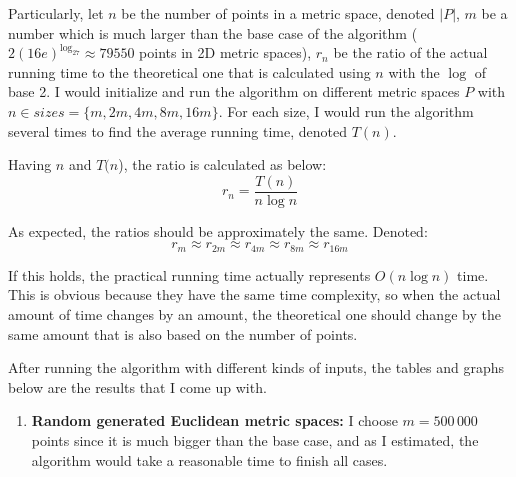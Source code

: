 \documentclass[12pt,english,]{article}
\providecommand{\tightlist}{%
  \setlength{\itemsep}{0pt}\setlength{\parskip}{0pt}}
\begin{document}
Particularly, let \(n\) be the number of points in a metric space,
denoted \(|P|\), \(m\) be a number which is much larger than the base
case of the algorithm (\(2(16e)^{\log_27} \approx 79550\) points in 2D
metric spaces), \(r_n\) be the ratio of the actual running time to the
theoretical one that is calculated using \(n\) with the \(\log\) of base
2. I would initialize and run the algorithm on different metric spaces
\(P\) with \(n \in sizes = \{m, 2m, 4m, 8m, 16m\}\). For each size, I
would run the algorithm several times to find the average running time,
denoted \(T(n)\).

Having \(n\) and \(T(n\)), the ratio is calculated as below:
\[r_n = \frac{T(n)}{n\log n}\]

As expected, the ratios should be approximately the same. Denoted:
\[r_m \approx r_{2m} \approx r_{4m} \approx r_{8m} \approx r_{16m}\]

If this holds, the practical running time actually represents
\(O(n\log n)\) time. This is obvious because they have the same time
complexity, so when the actual amount of time changes by an amount, the
theoretical one should change by the same amount that is also based on
the number of points.

After running the algorithm with different kinds of inputs, the tables
and graphs below are the results that I come up with.

\begin{enumerate}
\def\labelenumi{\arabic{enumi}.}
\tightlist
\item
  \textbf{Random generated Euclidean metric spaces:} I choose
  \(m = 500\,000\) points since it is much bigger than the base case,
  and as I estimated, the algorithm would take a reasonable time to
  finish all cases.
\end{enumerate}
\end{document}
